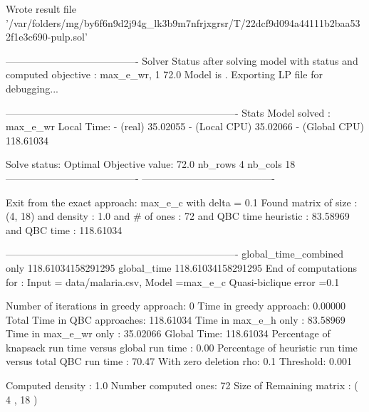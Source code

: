Wrote result file '/var/folders/mg/by6f6n9d2j94g_lk3b9m7nfrjxgrsr/T/22dcf9d094a44111b2baa532f1e3c690-pulp.sol'


----------------------------------------
Solver Status after solving model with status and computed objective : max_e_wr, 1 72.0
Model is . Exporting LP file for debugging...


----------------------------------------------------------------------
Stats
 Model solved : max_e_wr  Local Time:  - (real) 35.02055 - (Local CPU) 35.02066 - (Global CPU) 118.61034

 Solve status: Optimal Objective value: 72.0 nb_rows 4 nb_cols 18
----------------------------------------
----------------------------------------

        Exit from the exact approach: max_e_c
        with delta =  0.1
        Found matrix of size : (4, 18)
        and density : 1.0
        and # of ones : 72
        and QBC time heuristic  : 83.58969
        and QBC time  : 118.61034
        

----------------------------------------------------------------------
global_time_combined only   118.61034158291295 global_time  118.61034158291295
 End of computations for :    Input = data/malaria.csv,   Model =max_e_c  Quasi-biclique error  =0.1

    Number of iterations in greedy approach: 0
    Time in greedy approach: 0.00000
    Total Time in QBC approaches: 118.61034
    Time in max_e_h only : 83.58969
    Time in max_e_wr only : 35.02066
    Global Time: 118.61034
    Percentage of knapsack run time versus global run time : 0.00%
    Percentage of heuristic run time versus total QBC run time : 70.47%
    With zero deletion rho: 0.1
    Threshold: 0.001
    
 Computed density :  1.0  Number computed ones: 72
 Size of Remaining matrix : ( 4 , 18 )
 
